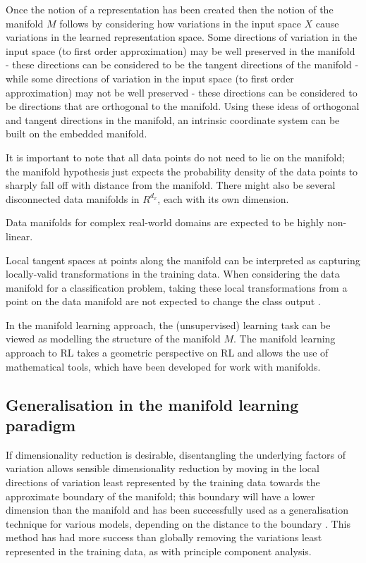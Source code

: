 Once the notion of a representation has been created then the notion of the manifold $M$ follows by considering how variations in the input space $X$ cause variations in the learned representation space.
Some directions of variation in the input space (to first order approximation) may be well preserved in the manifold - these directions can be considered to be the tangent directions of the manifold - while some directions of variation in the input space (to first order approximation) may not be well preserved - these directions can be considered to be directions that are orthogonal to the manifold.
Using these ideas of orthogonal and tangent directions in the manifold, an intrinsic coordinate system can be built on the embedded manifold.

It is important to note that all data points do not need to lie on the manifold; the manifold hypothesis just expects the probability density of the data points to sharply fall off with distance from the manifold.
There might also be several disconnected data manifolds in $R^{d_{x}}$, each with its own dimension.

Data manifolds for complex real-world domains are expected to be highly non-linear.

Local tangent spaces at points along the manifold can be interpreted as capturing locally-valid transformations in the training data.
When considering the data manifold for a classification problem, taking these local transformations from a point on the data manifold are not expected to change the class output \autocite{Bengio2013}.

In the manifold learning approach, the (unsupervised) learning task can be viewed as modelling the structure of the manifold $M$.
The manifold learning approach to RL takes a geometric perspective on RL and allows the use of mathematical tools, which have been developed for work with manifolds.

\subsection{Generalisation in the manifold learning paradigm}

If dimensionality reduction is desirable, disentangling the underlying factors of variation allows sensible dimensionality reduction by moving in the local directions of variation least represented by the training data towards the approximate boundary of the manifold; this boundary will have a lower dimension than the manifold and has been successfully used as a generalisation technique for various models, depending on the distance to the boundary \autocite{transtrum2015sloppiness}.
This method has had more success than globally removing the variations least represented in the training data, as with principle component analysis.


